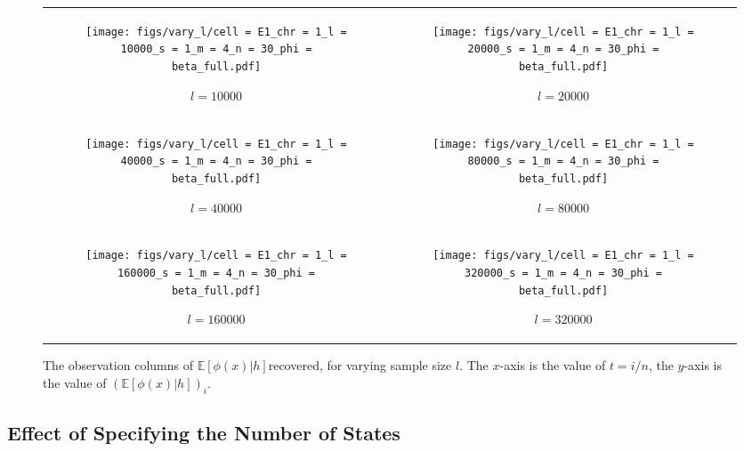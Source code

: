 \documentclass{article}
\def\E{\mathbb{E}}
\begin{document}
\begin{figure}[H]

    \begin{tabular}{cc}
    \begin{subfigure}[t]{0.45\textwidth}
        \texttt{[image: figs/vary\_l/cell = E1\_chr = 1\_l = 10000\_s = 1\_m = 4\_n = 30\_phi = beta\_full.pdf]}
        \caption{$l = 10000$}
    \end{subfigure}
    &
    \begin{subfigure}[t]{0.45\textwidth}
        \texttt{[image: figs/vary\_l/cell = E1\_chr = 1\_l = 20000\_s = 1\_m = 4\_n = 30\_phi = beta\_full.pdf]}
        \caption{$l = 20000$}
    \end{subfigure}
    \\
    \begin{subfigure}[t]{0.45\textwidth}
        \texttt{[image: figs/vary\_l/cell = E1\_chr = 1\_l = 40000\_s = 1\_m = 4\_n = 30\_phi = beta\_full.pdf]}
        \caption{$l = 40000$}
    \end{subfigure}
    &
    \begin{subfigure}[t]{0.45\textwidth}
        \texttt{[image: figs/vary\_l/cell = E1\_chr = 1\_l = 80000\_s = 1\_m = 4\_n = 30\_phi = beta\_full.pdf]}
        \caption{$l = 80000$}
    \end{subfigure}
    \\
    \begin{subfigure}[t]{0.45\textwidth}
        \texttt{[image: figs/vary\_l/cell = E1\_chr = 1\_l = 160000\_s = 1\_m = 4\_n = 30\_phi = beta\_full.pdf]}
        \caption{$l = 160000$}
    \end{subfigure}
    &
    \begin{subfigure}[t]{0.45\textwidth}
        \texttt{[image: figs/vary\_l/cell = E1\_chr = 1\_l = 320000\_s = 1\_m = 4\_n = 30\_phi = beta\_full.pdf]}
        \caption{$l = 320000$}
    \end{subfigure}
    \\
    \end{tabular}

    \caption{The observation columns of $\E[\phi(x)|h]$recovered, for varying sample size $l$. The $x$-axis is the value of $t = i/n$, the $y$-axis is the value of $(\E[\phi(x)|h])_i$.}
    \label{fig:varyl}
\end{figure}


\subsection{Effect of Specifying the Number of States}
\end{document}
